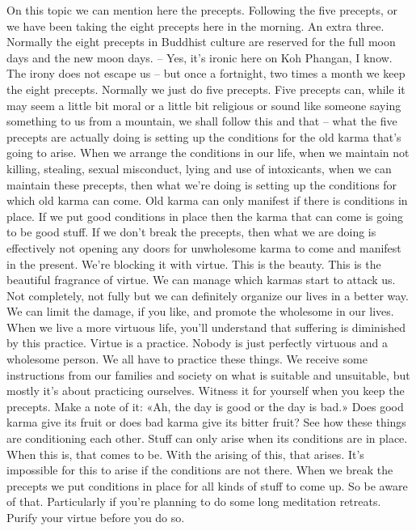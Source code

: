 \documentclass[letterpaper,10pt,english]{sphinxmanual}
\begin{document}
\sphinxAtStartPar
On  this  topic  we  can  mention  here  the  precepts.  Following  the  five
precepts, or we have been taking the eight precepts here in the morning. An
extra three. Normally the eight precepts in Buddhist culture are reserved for
the full moon days and the new moon days. – Yes, it’s ironic here on Koh
Phangan, I know. The irony does not escape us – but once a fortnight, two
times a month we keep the eight precepts. Normally we just do five precepts.
Five precepts can, while it may seem a little bit moral or a little bit religious
or  sound  like  someone  saying  something  to  us  from  a  mountain,  we  shall
follow this and that – what the five precepts are actually doing is setting up
the conditions for the old karma that’s going to arise. When we arrange the
conditions  in  our  life,  when  we  maintain  not  killing,  stealing,  sexual  misconduct, lying and use of intoxicants, when we can maintain these precepts,
then what we’re doing is setting up the conditions for which old karma can
come. Old karma can only manifest if there is conditions in place. If we put
  good conditions in place then the karma that can come is going to be good
stuff. If we don’t break the precepts, then what we are doing is effectively
not opening any doors for unwholesome karma to come and manifest in the
present. We’re blocking it with virtue. This is the beauty. This is the beautiful fragrance of virtue. We can manage which karmas start to attack us. Not
completely, not fully but we can definitely organize our lives in a better way.
We  can  limit  the  damage,  if  you  like,  and  promote  the  wholesome  in  our
lives. When  we  live  a  more  virtuous  life,  you’ll  understand  that  suffering
is diminished by this practice. Virtue is a practice. Nobody is just perfectly
virtuous and a wholesome person. We all have to practice these things. We
receive some instructions from our families and society on what is suitable
and  unsuitable,  but  mostly  it’s  about  practicing  ourselves.  Witness  it  for
yourself when you keep the precepts. Make a note of it: «Ah, the day is good
or the day is bad.» Does good karma give its fruit or does bad karma give its
bitter fruit? See how these things are conditioning each other. Stuff can only
arise when its conditions are in place. When this is, that comes to be. With
the arising of this, that arises. It’s impossible for this to arise if the conditions
are not there. When we break the precepts we put conditions in place for all
kinds of stuff to come up. So be aware of that. Particularly if you’re planning
to do some long meditation retreats. Purify your virtue before you do so.
\end{document}
